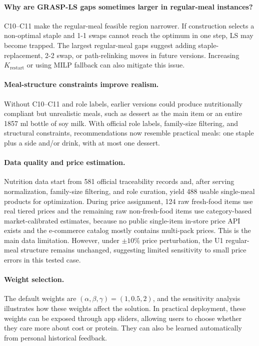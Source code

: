 \documentclass[a4paper]{article}
\begin{document}
\paragraph{Why are GRASP-LS gaps sometimes larger in regular-meal instances?}C10--C11 make the regular-meal feasible region narrower. If construction selects a non-optimal staple and 1-1 swaps cannot reach the optimum in one step, LS may become trapped. The largest regular-meal gaps suggest adding staple-replacement, 2-2 swap, or path-relinking moves in future versions. Increasing $K_{\text{restart}}$ or using MILP fallback can also mitigate this issue.

\paragraph{Meal-structure constraints improve realism.}Without C10--C11 and role labels, earlier versions could produce nutritionally compliant but unrealistic meals, such as dessert as the main item or an entire 1857 ml bottle of soy milk. With official role labels, family-size filtering, and structural constraints, recommendations now resemble practical meals: one staple plus a side and/or drink, with at most one dessert.

\paragraph{Data quality and price estimation.}Nutrition data start from 581 official traceability records and, after serving normalization, family-size filtering, and role curation, yield 488 usable single-meal products for optimization. During price assignment, 124 raw fresh-food items use real tiered prices and the remaining raw non-fresh-food items use category-based market-calibrated estimates, because no public single-item in-store price API exists and the e-commerce catalog mostly contains multi-pack prices. This is the main data limitation. However, under $\pm10\%$ price perturbation, the U1 regular-meal structure remains unchanged, suggesting limited sensitivity to small price errors in this tested case.

\paragraph{Weight selection.}The default weights are $(\alpha, \beta, \gamma)=(1, 0.5, 2)$, and the sensitivity analysis illustrates how these weights affect the solution. In practical deployment, these weights can be exposed through app sliders, allowing users to choose whether they care more about cost or protein. They can also be learned automatically from personal historical feedback.
\end{document}
